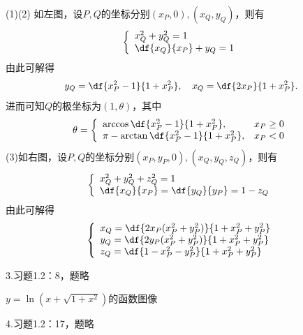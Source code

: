 (1)(2) 如左图，设$P,Q$的坐标分别$(x_P,0),(x_Q,y_Q)$，则有
$$
\left\{
\begin{array}{l}
	x^2_Q+y^2_Q=1\\
	\df{x_Q}{x_P}+y_Q=1
\end{array}
\right.
$$
由此可解得
$$y_Q=\df{x^2_P-1}{1+x^2_P},\quad x_Q=\df{2x_P}{1+x^2_P}.$$
进而可知$Q$的极坐标为$(1,\theta)$，其中
$$\theta=
\left\{
\begin{array}{ll}
	\arccos\df{x^2_P-1}{1+x^2_P},& x_P\geq 0\\
	\pi-\arctan\df{x^2_P-1}{1+x^2_P}, & x_P<0
\end{array}
\right.
$$
(3)如右图，设$P,Q$的坐标分别$(x_P,y_P,0),(x_Q,y_Q,z_Q)$，则有
$$
\left\{
\begin{array}{l}
	x^2_Q+y^2_Q+z^2_Q=1\\
	\df{x_Q}{x_P}=\df{y_Q}{y_P}=1-z_Q
\end{array}
\right.
$$
由此可解得
$$
\left\{
\begin{array}{l}
	x_Q=\df{2x_P(x^2_P+y^2_P)}{1+x^2_P+y^2_P}\\
	y_Q=\df{2y_P(x^2_P+y^2_P)}{1+x^2_P+y^2_P}\\
	z_Q=\df{1-x^2_P-y^2_P}{1+x^2_P+y^2_P}
\end{array}
\right.
$$

\bigskip

3.习题1.2：8，题略

\begin{center}
	
	$y=\ln(x+\sqrt{1+x^2})$的函数图像
\end{center}

\bigskip

4.习题1.2：17，题略

